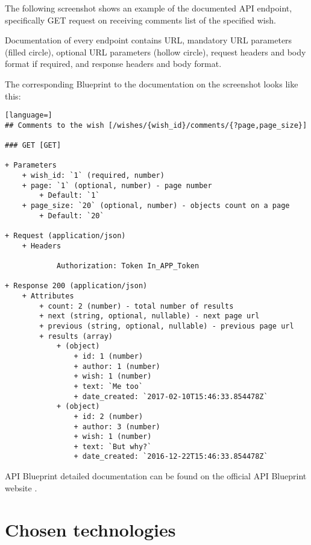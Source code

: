 The following screenshot shows an example of the documented \ac{API} endpoint, specifically GET request on receiving comments list of the specified wish.

\pagebreak

Documentation of every endpoint contains URL, mandatory URL parameters (filled circle), optional URL parameters (hollow circle), request headers and body format if required, and response headers and body format.

The corresponding Blueprint to the documentation on the screenshot looks like this:
\begin{lstlisting}[language=]
## Comments to the wish [/wishes/{wish_id}/comments/{?page,page_size}]

### GET [GET]

+ Parameters
    + wish_id: `1` (required, number)
    + page: `1` (optional, number) - page number
        + Default: `1`
    + page_size: `20` (optional, number) - objects count on a page
        + Default: `20`

+ Request (application/json)
    + Headers

            Authorization: Token In_APP_Token

+ Response 200 (application/json)
    + Attributes
        + count: 2 (number) - total number of results
        + next (string, optional, nullable) - next page url
        + previous (string, optional, nullable) - previous page url
        + results (array)
            + (object)
                + id: 1 (number)
                + author: 1 (number)
                + wish: 1 (number)
                + text: `Me too`
                + date_created: `2017-02-10T15:46:33.854478Z`
            + (object)
                + id: 2 (number)
                + author: 3 (number)
                + wish: 1 (number)
                + text: `But why?`
                + date_created: `2016-12-22T15:46:33.854478Z`
\end{lstlisting}

API Blueprint detailed documentation can be found on the official API Blueprint website \cite{apiblueprint}.



\section{Chosen technologies}


